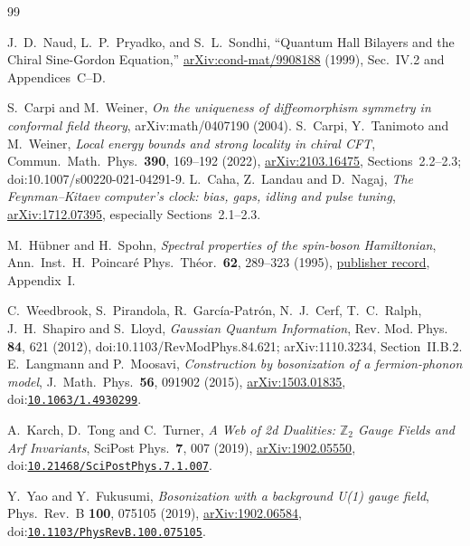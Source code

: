\begin{thebibliography}{99}

J.~D.~Naud, L.~P.~Pryadko, and S.~L.~Sondhi,
``Quantum Hall Bilayers and the Chiral Sine-Gordon Equation,''
\href{https://arxiv.org/abs/cond-mat/9908188}{arXiv:cond-mat/9908188}
(1999), Sec.~IV.2 and Appendices~C--D.

S.~Carpi and M.~Weiner, \emph{On the uniqueness of diffeomorphism symmetry in conformal field theory}, arXiv:math/0407190 (2004).
S.~Carpi, Y.~Tanimoto and M.~Weiner,
\emph{Local energy bounds and strong locality in chiral CFT},
Commun.~Math.~Phys.~\textbf{390}, 169--192 (2022),
\href{https://arxiv.org/abs/2103.16475}{arXiv:2103.16475},
Sections~2.2--2.3; doi:10.1007/s00220-021-04291-9.
L.~Caha, Z.~Landau and D.~Nagaj,
\emph{The Feynman--Kitaev computer's clock: bias, gaps, idling and pulse tuning},
\href{https://arxiv.org/abs/1712.07395}{arXiv:1712.07395},
especially Sections~2.1--2.3.

M.~H\"ubner and H.~Spohn,
\emph{Spectral properties of the spin-boson Hamiltonian},
Ann.~Inst.~H.~Poincar\'e Phys.~Th\'eor.~\textbf{62}, 289--323 (1995),
\href{https://www.numdam.org/item/AIHPA_1995__62_3_289_0/}{publisher record},
Appendix~I.

 C.~Weedbrook, S.~Pirandola, R.~Garc\'ia-Patr\'on,
N.~J.~Cerf, T.~C.~Ralph, J.~H.~Shapiro and S.~Lloyd,
\emph{Gaussian Quantum Information}, Rev. Mod. Phys. \textbf{84},
621 (2012), doi:10.1103/RevModPhys.84.621; arXiv:1110.3234,
Section~II.B.2.
E.~Langmann and P.~Moosavi,
\emph{Construction by bosonization of a fermion-phonon model},
J.~Math.~Phys.~\textbf{56}, 091902 (2015),
\href{https://arxiv.org/abs/1503.01835}{arXiv:1503.01835},
doi:\href{https://doi.org/10.1063/1.4930299}{\nolinkurl{10.1063/1.4930299}}.

A.~Karch, D.~Tong and C.~Turner,
\emph{A Web of 2d Dualities: $\mathbb Z_2$ Gauge Fields and Arf Invariants},
SciPost Phys.~\textbf{7}, 007 (2019),
\href{https://arxiv.org/abs/1902.05550}{arXiv:1902.05550},
doi:\href{https://doi.org/10.21468/SciPostPhys.7.1.007}{\nolinkurl{10.21468/SciPostPhys.7.1.007}}.

Y.~Yao and Y.~Fukusumi,
\emph{Bosonization with a background U(1) gauge field},
Phys.~Rev.~B \textbf{100}, 075105 (2019),
\href{https://arxiv.org/abs/1902.06584}{arXiv:1902.06584},
doi:\href{https://doi.org/10.1103/PhysRevB.100.075105}{\nolinkurl{10.1103/PhysRevB.100.075105}}.


\end{thebibliography}
